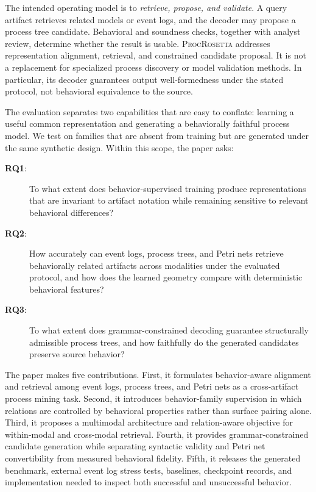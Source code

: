 \documentclass[mathematics,article,submit,moreauthors]{Definitions/mdpi}
\newcommand{\model}{\textsc{ProcRosetta}\xspace}
\newcommand{\RQone}{\textbf{RQ1}}
\newcommand{\RQtwo}{\textbf{RQ2}}
\newcommand{\RQthree}{\textbf{RQ3}}
\begin{document}
The intended operating model is to \emph{retrieve, propose, and validate}. A query artifact retrieves related models or event logs, and the decoder may propose a process tree candidate. Behavioral and soundness checks, together with analyst review, determine whether the result is usable. \model addresses representation alignment, retrieval, and constrained candidate proposal. It is not a replacement for specialized process discovery or model validation methods. In particular, its decoder guarantees output well-formedness under the stated protocol, not behavioral equivalence to the source.

The evaluation separates two capabilities that are easy to conflate: learning a useful common representation and generating a behaviorally faithful process model. We test on families that are absent from training but are generated under the same synthetic design. Within this scope, the paper asks:

\begin{description}
\item[\RQone:] To what extent does behavior-supervised training produce representations that are invariant to artifact notation while remaining sensitive to relevant behavioral differences?
\item[\RQtwo:] How accurately can event logs, process trees, and Petri nets retrieve behaviorally related artifacts across modalities under the evaluated protocol, and how does the learned geometry compare with deterministic behavioral features?
\item[\RQthree:] To what extent does grammar-constrained decoding guarantee structurally admissible process trees, and how faithfully do the generated candidates preserve source behavior?
\end{description}

The paper makes five contributions. First, it formulates behavior-aware alignment and retrieval among event logs, process trees, and Petri nets as a cross-artifact process mining task. Second, it introduces behavior-family supervision in which relations are controlled by behavioral properties rather than surface pairing alone. Third, it proposes a multimodal architecture and relation-aware objective for within-modal and cross-modal retrieval. Fourth, it provides grammar-constrained candidate generation while separating syntactic validity and Petri net convertibility from measured behavioral fidelity. Fifth, it releases the generated benchmark, external event log stress tests, baselines, checkpoint records, and implementation needed to inspect both successful and unsuccessful behavior.
\end{document}
